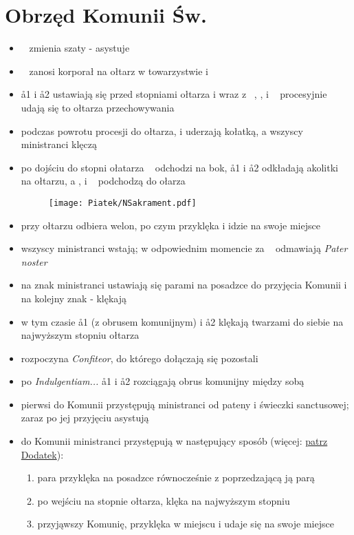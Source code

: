 \section{Obrzęd Komunii Św.}

    \begin{itemize}
     \item \ii~ zmienia szaty - asystuje 
     \item \ii~ zanosi korporał na ołtarz w towarzystwie  i 
     \item \aa1 i \aa2 ustawiają się przed stopniami ołtarza i wraz z \oo~, ,  i \ii~ procesyjnie udają się to ołtarza przechowywania 
     \item podczas powrotu procesji do ołtarza,  i  uderzają kołatką, a wszyscy ministranci klęczą
     \item po dojściu do stopni ołatarza \oo~ odchodzi na bok, \aa1 i \aa2 odkładają akolitki na ołtarzu, a ,  i \ii~ podchodzą do ołarza
     
     \begin{figure}[h]
     \centering
        \texttt{[image: Piatek/NSakrament.pdf]}
     \end{figure}
     
     \item przy ołtarzu  odbiera welon, po czym przyklęka i idzie na swoje miejsce
     \item wszyscy ministranci wstają; w odpowiednim momencie za \ii~ odmawiają \textit{Pater noster}
     \item na znak  ministranci ustawiają się parami na posadzce do przyjęcia Komunii i na kolejny znak - klękają
     \item w tym czasie \aa1 (z obrusem komunijnym) i \aa2 klękają twarzami do siebie na najwyższym stopniu ołtarza
     \item {} rozpoczyna \textit{Confiteor}, do którego dołączają się pozostali
     \item po \textit{Indulgentiam...} \aa1 i \aa2 rozciągają obrus komunijny między sobą
     \item pierwsi do Komunii przystępują ministranci od pateny i świeczki sanctusowej; zaraz po jej przyjęciu asystują \ii~
     \item do Komunii ministranci przystępują w następujący sposób (więcej: \hyperref[komunia]{patrz Dodatek}):
     
      \begin{enumerate}[leftmargin=1cm]
       \item para przyklęka na posadzce równocześnie z poprzedzającą ją parą
       \item po wejściu na stopnie ołtarza, klęka na najwyższym stopniu
       \item przyjąwszy Komunię, przyklęka w miejscu i udaje się na swoje miejsce
      \end{enumerate}
    

\end{itemize}
